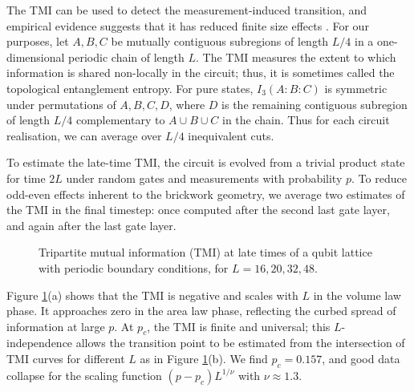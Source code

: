 \documentclass[10pt]{article}
\begin{document}
The TMI can be used to detect the measurement-induced transition, and empirical evidence suggests that it has reduced finite size effects \cite{gullans2019dynamical, zabalo2020critical}. For our purposes, let $A,B,C$ be mutually contiguous subregions of length $L/4$ in a one-dimensional periodic chain of length $L$. The TMI measures the extent to which information is shared non-locally in the circuit; thus, it is sometimes called the topological entanglement entropy. For pure states, $I_3(A:B:C)$ is symmetric under permutations of $A,B,C,D$, where $D$ is the remaining contiguous subregion of length $L/4$ complementary to $A \cup B \cup C$ in the chain. Thus for each circuit realisation, we can average over $L/4$ inequivalent cuts.

To estimate the late-time TMI, the circuit is evolved from a trivial product state for time $2L$ under random gates and measurements with probability $p$. To reduce odd-even effects inherent to the brickwork geometry, we average two estimates of the TMI in the final timestep: once computed after the second last gate layer, and again after the last gate layer.

\begin{figure}
\centering
{}
\caption{Tripartite mutual information (TMI) at late times of a qubit lattice with periodic boundary conditions, for $L=16,20,32,48$.}
\label{fig_tmi}
\end{figure}

Figure \ref{fig_tmi}(a) shows that the TMI is negative and scales with $L$ in the volume law phase. It approaches zero in the area law phase, reflecting the curbed spread of information at large $p$. At $p_c$, the TMI is finite and universal; this $L$-independence allows the transition point to be estimated from the intersection of TMI curves for different $L$ as in Figure \ref{fig_tmi}(b). We find $p_c = 0.157$, and good data collapse for the scaling function $(p-p_c) L^{1/\nu}$ with $\nu\approx1.3$.
\end{document}
